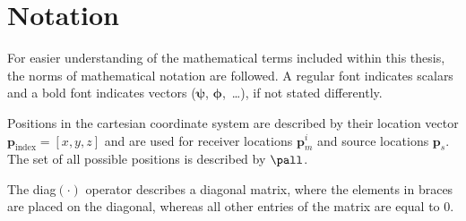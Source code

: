 \section{Notation}
\label{chap:1notation}

For easier understanding of the mathematical terms included within this thesis, the norms of mathematical notation are followed. A regular font indicates scalars and a bold font indicates vectors ($\bm\psi$, $\bm\phi$,~\dots), if not stated differently.

Positions in the cartesian coordinate system are described by their location vector $\bm p_{\text{index}}=[x, y, z]$ and are used for receiver locations $\bm p_m^i$ and source locations $\bm p_s$. The set of all possible positions is described by $\pall$. 

The diag$(\cdot)$ operator describes a diagonal matrix, where the elements in braces are placed on the diagonal, whereas all other entries of the matrix are equal to 0.

